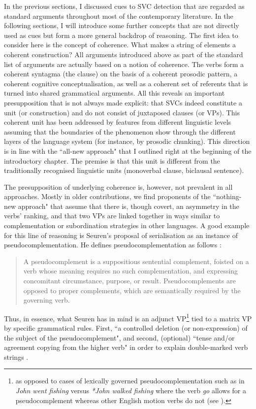 In the previous sections, I discussed cues to SVC detection that are regarded as standard arguments throughout most of the contemporary literature. In the following sections, I will introduce some further concepts that are not directly used as cues but form a more general backdrop of reasoning. The first idea to consider here is the concept of coherence. What makes a string of elements a coherent construction? All arguments introduced above as part of the standard list of arguments are actually based on a notion of coherence. The verbs form a coherent syntagma (the clause) on the basis of a coherent prosodic pattern, a coherent cognitive conceptualisation, as well as a coherent set of referents that is turned into shared grammatical arguments. All this reveals an important presupposition that is not always made explicit: that SVCs indeed constitute a unit (or construction) and do not consist of juxtaposed clauses (or VPs). This coherent unit has been addressed by features from different linguistic levels assuming that the boundaries of the phenomenon show through the different layers of the language system (for instance, by prosodic chunking). This direction is in line with the ``all-new approach" that I outlined right at the beginning of the introductory chapter. The premise is that this unit is different from the traditionally recognised linguistic units (monoverbal clause, biclausal sentence). 

The presupposition of underlying coherence is, however, not prevalent in all approaches. Mostly in older contributions, we find proponents of the ``nothing-new approach" that assume that there is, though covert, an asymmetry in the verbs' ranking, and that two VPs are linked together in ways similar to complementation or subordination strategies in other languages. A good example for this line of reasoning is Seuren's proposal of serialisation as an instance of pseudocomplementation. He defines pseudocomplementation as follows \citep[196]{seuren1991definition}: 

\begin{quote} A pseudocomplement is a suppositious sentential complement, foisted on a verb whose meaning requires no such complementation, and expressing concomitant circumstance, purpose, or result. Pseudocomplements are opposed to proper complements, which are semantically required by the governing verb.
\end{quote}

Thus, in essence, what Seuren has in mind is an adjunct VP\footnote{as opposed to cases of lexically governed pseudocomplementation such as in \textit{John went fishing} versus \textit{*John walked fishing} where the verb \textit{go} allows for a pseudocomplement whereas other English motion verbs do not (see \citealt[197]{seuren1991definition}).} tied to a matrix VP by specific grammatical rules. First, ``a controlled deletion (or non-expression) of the subject of the pseudocomplement", and second, (optional) ``tense and/or agreement copying from the higher verb" in order to explain double-marked verb strings \citep[197]{seuren1991definition}.


